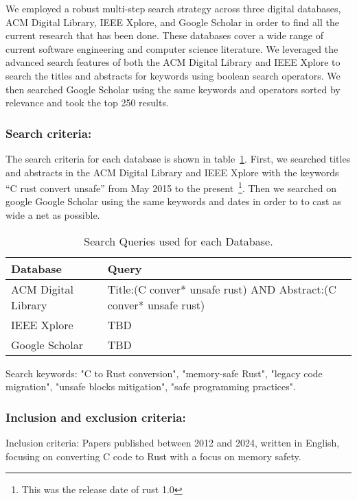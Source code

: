 \documentclass[sigconf]{acmart}
\begin{document}
We employed a robust multi-step search strategy across three digital databases, ACM Digital Library,
IEEE Xplore, and Google Scholar in order to find all the current research that has been done. These
databases cover a wide range of current software engineering and computer science literature. We
leveraged the advanced search features of both the ACM Digital Library and IEEE Xplore to search the
titles and abstracts for keywords using boolean search operators. We then searched Google Scholar
using the same keywords and operators sorted by relevance and took the top 250 results.

\subsubsection{Search criteria:}

The search criteria for each database is shown in table~\ref{tab:keywords}.  First, we searched
titles and abstracts in the ACM Digital Library and IEEE Xplore with the keywords ``C rust convert
unsafe'' from May 2015 to the present~\footnote{This was the release date of rust 1.0}. Then we
searched on google Google Scholar using the same keywords and dates in order to to cast as wide a
net as possible.


\begin{table}
\begin{tabular}{|| p{3cm}| p{5cm} ||}
 \hline
 Database & Query \\
 \hline\hline
 ACM Digital Library & Title:(C conver* unsafe rust) AND Abstract:(C conver* unsafe rust)  \\
 IEEE Xplore & TBD \\
 Google Scholar & TBD \\
 \hline
\end{tabular}
\caption{Search Queries used for each Database.}
\label{tab:keywords}
\end{table}


Search keywords: "C to Rust conversion", "memory-safe Rust", "legacy code migration", "unsafe blocks
mitigation", "safe programming practices".

\subsubsection{Inclusion and exclusion criteria:}

Inclusion criteria: Papers published between 2012 and 2024, written in English, focusing on
converting C code to Rust with a focus on memory safety.
\end{document}
